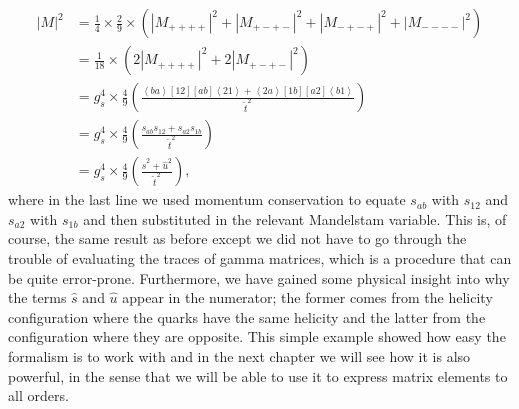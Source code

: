 \begin{equation}
\begin{split}
|M|^2 &= \frac{1}{4} \times \frac{2}{9} \times \left(|M_{++++}|^2 + |M_{+-+-}|^2  + |M_{-+-+}|^2  + |M_{----}|^2 \right) \\
&= \frac{1}{18} \times \left(2 |M_{++++}|^2 + 2 |M_{+-+-}|^2 \right) \\
&= g_s^4 \times \frac{4}{9} \left(\frac{ \left<b a \right> [1 2] [ab] \left<2 1 \right> + \left<2 a \right> [1 b] [a2] \left<b 1 \right> }{\hat{t}^2}\right) \\
&=  g_s^4 \times \frac{4}{9} \left(\frac{s_{ab} s_{12} + s_{a2}s_{1b} }{\hat{t}^2} \right) \\
&= g_s^4 \times \frac{4}{9} \left(\frac{\hat{s}^2 + \hat{u}^2}{\hat{t}^2} \right),
\end{split}
\end{equation}
where in the last line we used momentum conservation to equate $s_{ab}$ with $s_{12}$ and $s_{a2}$ with $s_{1b}$ and then substituted in the relevant Mandelstam variable. This is, of course, the same result as before except we did not have to go through the trouble of evaluating the traces of gamma matrices, which is a procedure that can be quite error-prone. Furthermore, we have gained some physical insight into why the terms $\hat{s}$ and $\hat{u}$ appear in the numerator; the former comes from the helicity configuration where the quarks have the same helicity and the latter from the configuration where they are opposite. This simple example showed how easy the formalism is to work with and in the next chapter we will see how it is also powerful, in the sense that we will be able to use it to express matrix elements to all orders. 